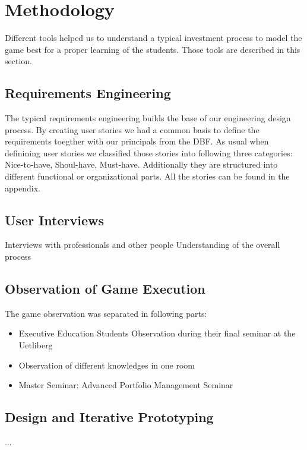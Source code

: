 \section{Methodology}
Different tools helped us to understand a typical investment process to model the game best for a proper learning of the students. Those tools are described in this section.

\subsection{Requirements Engineering}
The typical requirements engineering builds the base of our engineering design process. By creating user stories we had a common basis to define the requirements toegther with our principals from the DBF. As usual when definining user stories we classified those stories into following three categories: Nice-to-have, Shoul-have, Must-have. Additionally they are structured into different functional or organizational parts. All the stories can be found in the appendix.

\subsection{User Interviews}
Interviews with professionals and other people
Understanding of the overall process

\subsection{Observation of Game Execution}
The game observation was separated in following parts:
\begin{itemize}
  \item Executive Education Students Observation during their final seminar at the Uetliberg
  \item Observation of different knowledges in one room
  \item Master Seminar: Advanced Portfolio Management Seminar
\end{itemize}

\subsection{Design and Iterative Prototyping}
...
